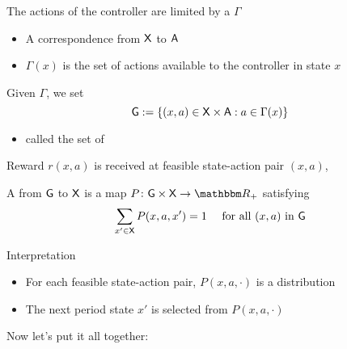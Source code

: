\begin{frame}

    The actions of the controller are limited 
    by a  $\Gamma$

    \begin{itemize}
        \item A correspondence from $\mathsf X$ to $\mathsf A$
    \vspace{0.5em}
        \item $\Gamma(x)$ is the set of actions available to the controller in
            state $x$
    \end{itemize}

    \vspace{0.5em}
    \vspace{0.5em}

    Given $\Gamma$, we set
    $$\mathsf G := \{ (x, a) \in \mathsf X \times \mathsf A : a \in \Gamma(x) \}$$

    \vspace{0.5em}
    \begin{itemize}
        \item called the set of 
    \end{itemize}


    \vspace{0.5em}
    \vspace{0.5em}
    Reward $r(x, a)$ is received at feasible state-action pair $(x, a)$, 

\end{frame}


\begin{frame}



    A  from $\mathsf G$ to $\mathsf X$ is a map 
    $P \colon \Gsf \times \Xsf \to \RR_+$
            satisfying
            \begin{equation*}
                \sum_{x' \in \mathsf X} P(x, a, x') = 1
                \quad \text{ for all $(x,a)$ in $\mathsf G$} 
            \end{equation*}

    \vspace{0.5em}
    \vspace{0.5em}
    Interpretation
    \begin{itemize}
        \item For each feasible state-action pair, $P(x,a, \cdot)$ is a
            distribution
    \vspace{0.5em}
        \item The next period state $x'$ is selected from $P(x,a, \cdot)$
    \end{itemize}


    \vspace{0.5em}
    \vspace{0.5em}
    \vspace{0.5em}

    Now let's put it all together:

\end{frame}


